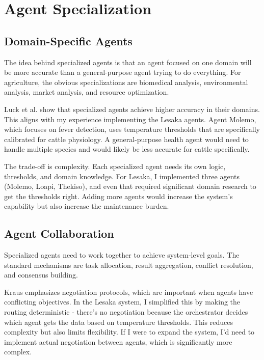 \section{Agent Specialization}

\subsection{Domain-Specific Agents}

The idea behind specialized agents is that an agent focused on one domain will be more accurate than a general-purpose agent trying to do everything. For agriculture, the obvious specializations are biomedical analysis, environmental analysis, market analysis, and resource optimization.

Luck et al. \cite{luck2003agent} show that specialized agents achieve higher accuracy in their domains. This aligns with my experience implementing the Lesaka agents. Agent Molemo, which focuses on fever detection, uses temperature thresholds that are specifically calibrated for cattle physiology. A general-purpose health agent would need to handle multiple species and would likely be less accurate for cattle specifically.

The trade-off is complexity. Each specialized agent needs its own logic, thresholds, and domain knowledge. For Lesaka, I implemented three agents (Molemo, Loapi, Thekiso), and even that required significant domain research to get the thresholds right. Adding more agents would increase the system's capability but also increase the maintenance burden.

\subsection{Agent Collaboration}

Specialized agents need to work together to achieve system-level goals. The standard mechanisms are task allocation, result aggregation, conflict resolution, and consensus building.

Kraus \cite{kraus1997negotiation} emphasizes negotiation protocols, which are important when agents have conflicting objectives. In the Lesaka system, I simplified this by making the routing deterministic - there's no negotiation because the orchestrator decides which agent gets the data based on temperature thresholds. This reduces complexity but also limits flexibility. If I were to expand the system, I'd need to implement actual negotiation between agents, which is significantly more complex.

